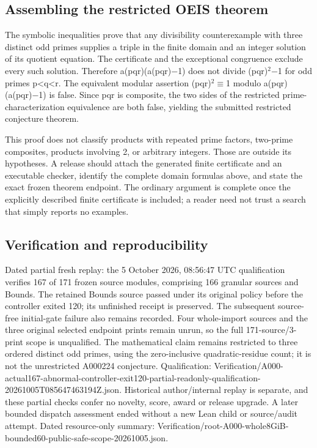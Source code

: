 \documentclass[11pt,a4paper]{article}
\begin{document}
\subsection{Assembling the restricted OEIS theorem}
The symbolic inequalities prove that any divisibility counterexample with three distinct odd primes supplies a triple in the finite domain and an integer solution of its quotient equation. The certificate and the exceptional congruence exclude every such solution. Therefore a(pqr)(a(pqr)\ensuremath{-}1) does not divide (pqr)\ensuremath{^2}\ensuremath{-}1 for odd primes p<q<r. The equivalent modular assertion (pqr)\ensuremath{^2}\ensuremath{\equiv}1 modulo a(pqr)(a(pqr)\ensuremath{-}1) is false. Since pqr is composite, the two sides of the restricted prime-characterization equivalence are both false, yielding the submitted restricted conjecture theorem.

This proof does not classify products with repeated prime factors, two-prime composites, products involving 2, or arbitrary integers. Those are outside its hypotheses. A release should attach the generated finite certificate and an executable checker, identify the complete domain formulas above, and state the exact frozen theorem endpoint. The ordinary argument is complete once the explicitly described finite certificate is included; a reader need not trust a search that simply reports no examples.

\subsection{Verification and reproducibility}
Dated partial fresh replay: the 5 October 2026, 08:56:47 UTC qualification verifies 167 of 171 frozen source modules, comprising 166 granular sources and Bounds. The retained Bounds source passed under its original policy before the controller exited 120; its unfinished receipt is preserved. The subsequent source-free initial-gate failure also remains recorded. Four whole-import sources and the three original selected endpoint prints remain unrun, so the full 171-source/3-print scope is unqualified. The mathematical claim remains restricted to three ordered distinct odd primes, using the zero-inclusive quadratic-residue count; it is not the unrestricted A000224 conjecture. Qualification: Verification/A000-actual167-abnormal-controller-exit120-partial-readonly-qualification-20261005T085647463194Z.json. Historical author/internal replay is separate, and these partial checks confer no novelty, score, award or release upgrade. A later bounded dispatch assessment ended without a new Lean child or source/audit attempt. Dated resource-only summary: Verification/root-A000-whole8GiB-bounded60-public-safe-scope-20261005.json.
\end{document}
